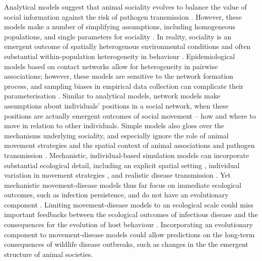 Analytical models suggest that animal sociality evolves to balance the value of social information against the risk of pathogen transmission \citep[][]{bonds2005,prado2009,ashby2022}.
However, these models make a number of simplifying assumptions, including homogeneous populations, and single parameters for sociality \citep[][]{bonds2005,prado2009,ashby2022}.
In reality, sociality is an emergent outcome of spatially heterogenous environmental conditions and often substantial within-population heterogeneity in behaviour \citep{tanner2012, wolf2012}.
Epidemiological models based on contact networks allow for heterogeneity in pairwise associations; however, these models are sensitive to the network formation process, and sampling biases in empirical data collection can complicate their parameterisation \citep[][]{white2017}.
Similar to analytical models, network models make assumptions about individuals' positions in a social network, when these positions are actually emergent outcomes of social movement -- how and where to move in relation to other individuals.
Simple models also gloss over the mechanisms underlying sociality, and especially ignore the role of animal movement strategies and the spatial context of animal associations and pathogen transmission \citep{albery2021}.
Mechanistic, individual-based simulation models can incorporate substantial ecological detail, including an explicit spatial setting \citep{deangelis2019}, individual variation in movement strategies \citep{spiegel2017,lunn2021}, and realistic disease transmission \citep{white2018, scherer2020, lunn2021}.
Yet mechanistic movement-disease models thus far focus on immediate ecological outcomes, such as infection persistence, and do not have an evolutionary component \citep{white2018,scherer2020,lunn2021}.
Limiting movement-disease models to an ecological scale could miss important feedbacks between the ecological outcomes of infectious disease and the consequences for the evolution of host behaviour \citep{cantor2021}.
Incorporating an evolutionary component to movement-disease models could allow predictions on the long-term consequences of wildlife disease outbreaks, such as changes in the the emergent structure of animal societies.

